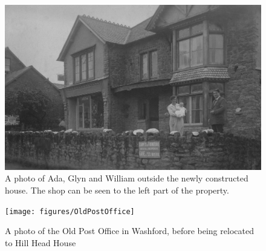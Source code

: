 \begin{figure}[p]
     \includegraphics[width=1\textwidth]{figures/HillHeadHouse}
     \caption{A photo of Ada, Glyn and William outside the newly constructed house. The shop can be seen to the left part of the property.}
     \label{fig:HillHeadHouse}
\end{figure}

\begin{figure}
     \texttt{[image: figures/OldPostOffice]}
     \caption{A photo of the Old Post Office in Washford, before being relocated to Hill Head House}
     \label{fig:PostOffice}
\end{figure}

